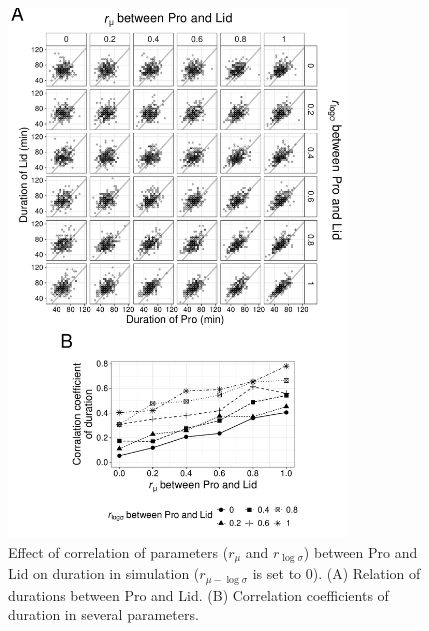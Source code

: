 \documentclass[a4paper,11pt]{article}
\begin{document}
\begin{figure}[htbp]
 \centering
 \includegraphics[width=0.8\textwidth]{Fig/Fig4.pdf}
 \caption{Effect of correlation of parameters ($r_{\mu}$ and $r_{\log \sigma}$) between Pro and Lid on duration in simulation ($r_{\mu - \log \sigma}$ is set to 0). (A) Relation of durations between Pro and Lid. (B) Correlation coefficients of duration in several parameters.}
 \label{fig4}
\end{figure}

\clearpage
\end{document}
